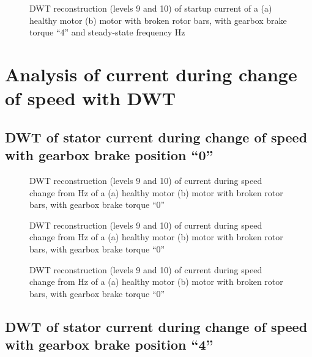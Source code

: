 \documentclass[a4paper,11pt]{report}
\begin{document}
\begin{figure}[htbp]
\centering
\subfigure[]{\texttt{[image: h450st]}}
\subfigure[]{\texttt{[image: b450st]}}
\caption{DWT reconstruction (levels 9 and 10) of startup current of a (a) healthy motor (b) motor with broken rotor bars, with gearbox brake torque ``4'' and steady-state frequency \unit[50]{Hz}} \label{hb450st}
\end{figure}

\clearpage
\section{Analysis of current during change of speed with DWT}
\subsection{DWT of stator current during change of speed with gearbox brake position ``0''}

\begin{figure}[htbp]
\centering
\subfigure[]{\texttt{[image: h030sc]}}
\subfigure[]{\texttt{[image: b030sc]}}
\caption{DWT reconstruction (levels 9 and 10) of current during speed change from \unit[30]{Hz} of a (a) healthy motor (b) motor with broken rotor bars, with gearbox brake torque ``0''} \label{hb030sc}
\end{figure}

\begin{figure}[htbp]
\centering
\subfigure[]{\texttt{[image: h040sc]}}
\subfigure[]{\texttt{[image: b040sc]}}
\caption{DWT reconstruction (levels 9 and 10) of current during speed change from \unit[40]{Hz} of a (a) healthy motor (b) motor with broken rotor bars, with gearbox brake torque ``0''} \label{hb040sc}
\end{figure}

\begin{figure}[htbp]
\centering
\subfigure[]{\texttt{[image: h050sc]}}
\subfigure[]{\texttt{[image: b050sc]}}
\caption{DWT reconstruction (levels 9 and 10) of current during speed change from \unit[50]{Hz} of a (a) healthy motor (b) motor with broken rotor bars, with gearbox brake torque ``0''} \label{hb050sc}
\end{figure}

\clearpage
\subsection{DWT of stator current during change of speed with gearbox brake position ``4''}
\end{document}
